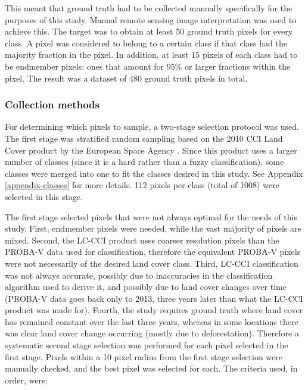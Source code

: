 \documentclass[a4paper,12pt]{scrbook}
\begin{document}
This meant that ground truth had to be collected manually specifically for the purposes of this study. Manual remote sensing image interpretation \citep{defries1998training} was used to achieve this. The target was to obtain at least 50 ground truth pixels for every class. A pixel was considered to belong to a certain class if that class had the majority fraction in the pixel. In addition, at least 15 pixels of each class had to be endmember pixels: ones that amount for 95\% or larger fractions within the pixel. The result was a dataset of 480 ground truth pixels in total.

\subsubsection{Collection methods}

For determining which pixels to sample, a two-stage selection protocol was used. The first stage was stratified random sampling based on the 2010 CCI Land Cover product by the European Space Agency \citep{lccciguide}. Since this product uses a larger number of classes (since it is a hard rather than a fuzzy classification), some classes were merged into one to fit the classes desired in this study. See Appendix \ref{appendix-classes} for more details. 112 pixels per class (total of 1008) were selected in this stage.

The first stage selected pixels that were not always optimal for the needs of this study. First, endmember pixels were needed, while the vast majority of pixels are mixed. Second, the LC-CCI product uses coarser resolution pixels than the PROBA-V data used for classification, therefore the equivalent PROBA-V pixels were not necessarily of the desired land cover class. Third, LC-CCI classification was not always accurate, possibly due to inaccuracies in the classification algorithm used to derive it, and possibly due to land cover changes over time (PROBA-V data goes back only to 2013, three years later than what the LC-CCI product was made for). Fourth, the study requires ground truth where land cover has remained constant over the last three years, whereas in some locations there was clear land cover change occurring (mostly due to deforestation). Therefore a systematic second stage selection was performed for each pixel selected in the first stage. Pixels within a 10 pixel radius from the first stage selection were manually checked, and the best pixel was selected for each. The criteria used, in order, were:
\end{document}
